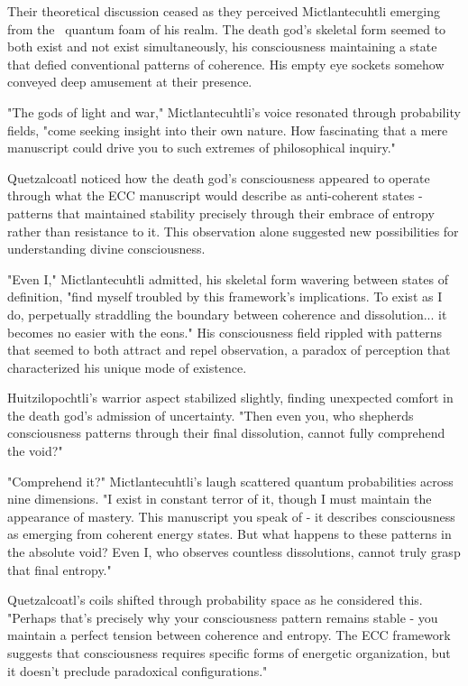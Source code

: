 Their theoretical discussion ceased as they perceived Mictlantecuhtli emerging from the~ quantum foam of his realm. The death god's skeletal form seemed to both exist and not exist simultaneously, his consciousness maintaining a state that defied conventional patterns of coherence. His empty eye sockets somehow conveyed deep amusement at their presence.

"The gods of light and war," Mictlantecuhtli's voice resonated through probability fields, "come seeking insight into their own nature. How fascinating that a mere manuscript could drive you to such extremes of philosophical inquiry."

Quetzalcoatl noticed how the death god's consciousness appeared to operate through what the ECC manuscript would describe as anti-coherent states - patterns that maintained stability precisely through their embrace of entropy rather than resistance to it. This observation alone suggested new possibilities for understanding divine consciousness.

"Even I," Mictlantecuhtli admitted, his skeletal form wavering between states of definition, "find myself troubled by this framework's implications. To exist as I do, perpetually straddling the boundary between coherence and dissolution... it becomes no easier with the eons." His consciousness field rippled with patterns that seemed to both attract and repel observation, a paradox of perception that characterized his unique mode of existence.

Huitzilopochtli's warrior aspect stabilized slightly, finding unexpected comfort in the death god's admission of uncertainty. "Then even you, who shepherds consciousness patterns through their final dissolution, cannot fully comprehend the void?"

"Comprehend it?" Mictlantecuhtli's laugh scattered quantum probabilities across nine dimensions. "I exist in constant terror of it, though I must maintain the appearance of mastery. This manuscript you speak of - it describes consciousness as emerging from coherent energy states. But what happens to these patterns in the absolute void? Even I, who observes countless dissolutions, cannot truly grasp that final entropy."

Quetzalcoatl's coils shifted through probability space as he considered this. "Perhaps that's precisely why your consciousness pattern remains stable - you maintain a perfect tension between coherence and entropy. The ECC framework suggests that consciousness requires specific forms of energetic organization, but it doesn't preclude paradoxical configurations."

